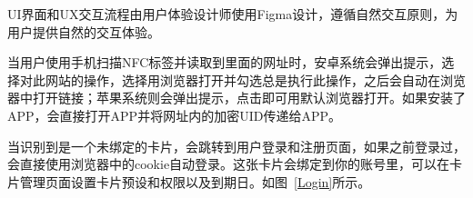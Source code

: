 \documentclass[UTF8]{ctexart}
\begin{document}
UI界面和UX交互流程由用户体验设计师使用Figma设计，遵循自然交互原则，为用户提供自然的交互体验。

当用户使用手机扫描NFC标签并读取到里面的网址时，安卓系统会弹出提示，选择对此网站的操作，选择用浏览器打开并勾选总是执行此操作，之后会自动在浏览器中打开链接；苹果系统则会弹出提示，点击即可用默认浏览器打开。如果安装了APP，会直接打开APP并将网址内的加密UID传递给APP。

当识别到是一个未绑定的卡片，会跳转到用户登录和注册页面，如果之前登录过，会直接使用浏览器中的cookie自动登录。这张卡片会绑定到你的账号里，可以在卡片管理页面设置卡片预设和权限以及到期日。如图~\ref{Login}所示。

\begin{figure}[htbp]
    \centering
\end{figure}
\end{document}
